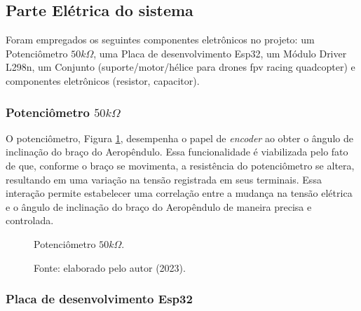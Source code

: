 \subsection{Parte Elétrica do sistema}

Foram empregados os seguintes componentes eletrônicos no projeto: um Potenciômetro $50k\Omega$, uma Placa de desenvolvimento Esp32, um Módulo Driver L298n, um Conjunto (suporte/motor/hélice para drones fpv racing quadcopter) e componentes eletrônicos (resistor, capacitor).

\subsubsection{Potenciômetro $50k\Omega$}

O potenciômetro, Figura \ref{fig3:image_04}, desempenha o papel de \textit{encoder} ao obter o ângulo de inclinação do braço do Aeropêndulo. Essa funcionalidade é viabilizada pelo fato de que, conforme o braço se movimenta, a resistência do potenciômetro se altera, resultando em uma variação na tensão registrada em seus terminais. Essa interação permite estabelecer uma correlação entre a mudança na tensão elétrica e o ângulo de inclinação do braço do Aeropêndulo de maneira precisa e controlada.

\begin{figure}[!h]
	\centering
	\caption{Potenciômetro $50k\Omega$.}
	\caption*{Fonte: elaborado pelo autor (2023).}
	\label{fig3:image_04}
\end{figure}




\subsubsection{Placa de desenvolvimento Esp32}

